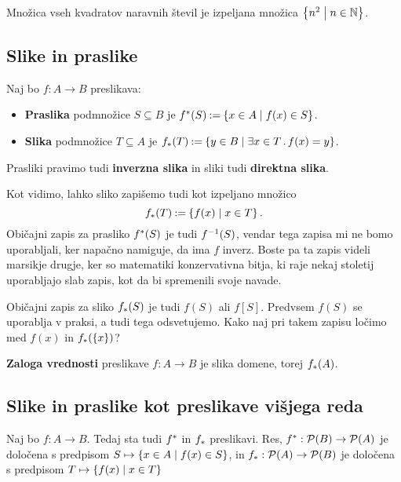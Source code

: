 \begin{primer}
  Množica vseh kvadratov naravnih števil je izpeljana množica $\left\{ n^2 \; \middle| \; n \in \mathbb{N} \right\}$.
\end{primer}


\subsection{Slike in praslike}

\begin{definicija}
  Naj bo $f : A \to B$ preslikava:
  \begin{itemize}
  \item \textbf{Praslika} podmnožice $S \subseteq B$ je $f^{*}(S) \mathbin{{:}{=}} \left\{ x \in A \; \middle| \; f(x) \in S \right\}$.
  \item \textbf{Slika} podmnožice $T \subseteq A$ je $f_{*}(T) \mathbin{{:}{=}} \left\{ y \in B \; \middle| \; \exists x \in T \,.\, f(x) = y \right\}$.
  \end{itemize}
\end{definicija}
%
Prasliki pravimo tudi \textbf{inverzna slika} in sliki tudi \textbf{direktna slika}.

Kot vidimo, lahko sliko zapišemo tudi kot izpeljano množico
%
\begin{equation*}
  f_{*}(T) \mathbin{{:}{=}} \left\{ f(x) \; \middle| \; x \in T \right\}.
\end{equation*}
%
Običajni zapis za prasliko $f^{*}(S)$ je tudi ${f}^{-1}(S)$, vendar tega zapisa mi ne bomo uporabljali, ker napačno namiguje, da ima $f$ inverz. Boste pa ta zapis videli marsikje drugje, ker so matematiki konzervativna bitja, ki raje nekaj stoletij uporabljajo slab zapis, kot da bi spremenili svoje navade.

Običajni zapis za sliko $f_{*}(S)$ je tudi $f(S)$ ali $f[S]$. Predvsem $f(S)$ se uporablja v praksi, a tudi tega odsvetujemo. Kako naj pri takem zapisu ločimo med $f(x)$ in $f_{*}(\left\{x\right\})$?

\begin{definicija}
  \textbf{Zaloga vrednosti} preslikave $f : A \to B$ je slika domene, torej $f_{*}(A)$.
\end{definicija}


\subsection{Slike in praslike kot preslikave višjega reda}

Naj bo $f : A \to B$. Tedaj sta tudi $f^{*}$ in $f_{*}$ preslikavi.
%
Res, $f^{*} : \mathcal{P}(B) \to \mathcal{P}(A)$ je določena s predpisom $S \mapsto \left\{ x \in A \; \middle| \; f(x) \in S \right\}$, in
$f_{*} : \mathcal{P}(A) \to \mathcal{P}(B)$ je določena s predpisom $T \mapsto \left\{ f(x) \; \middle| \; x \in T \right\}$

